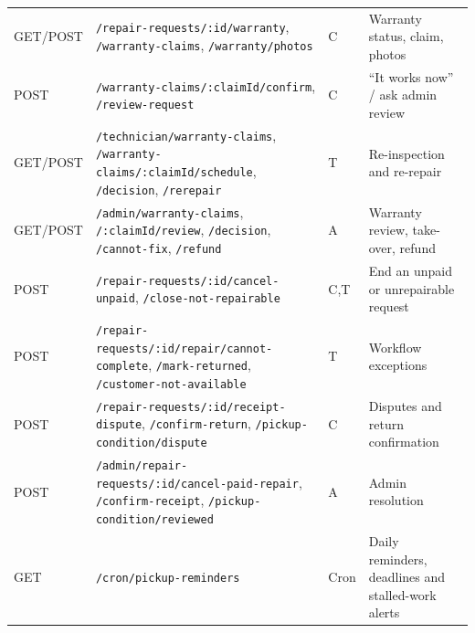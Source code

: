 \documentclass{standalone}
\begin{document}
{\begin{longtable}{@{}p{1.5cm}p{7.4cm}p{0.9cm}p{3.6cm}@{}}
GET/POST & \nolinkurl{/repair-requests/:id/warranty}, \nolinkurl{/warranty-claims}, \nolinkurl{/warranty/photos} & C & Warranty status, claim, photos \\
POST & \nolinkurl{/warranty-claims/:claimId/confirm}, \nolinkurl{/review-request} & C & ``It works now'' / ask admin review \\
GET/POST & \nolinkurl{/technician/warranty-claims}, \nolinkurl{/warranty-claims/:claimId/schedule}, \nolinkurl{/decision}, \nolinkurl{/rerepair} & T & Re-inspection and re-repair \\
GET/POST & \nolinkurl{/admin/warranty-claims}, \nolinkurl{/:claimId/review}, \nolinkurl{/decision}, \nolinkurl{/cannot-fix}, \nolinkurl{/refund} & A & Warranty review, take-over, refund \\
POST & \nolinkurl{/repair-requests/:id/cancel-unpaid}, \nolinkurl{/close-not-repairable} & C,T & End an unpaid or unrepairable request \\
POST & \nolinkurl{/repair-requests/:id/repair/cannot-complete}, \nolinkurl{/mark-returned}, \nolinkurl{/customer-not-available} & T & Workflow exceptions \\
POST & \nolinkurl{/repair-requests/:id/receipt-dispute}, \nolinkurl{/confirm-return}, \nolinkurl{/pickup-condition/dispute} & C & Disputes and return confirmation \\
POST & \nolinkurl{/admin/repair-requests/:id/cancel-paid-repair}, \nolinkurl{/confirm-receipt}, \nolinkurl{/pickup-condition/reviewed} & A & Admin resolution \\
GET & \nolinkurl{/cron/pickup-reminders} & Cron & Daily reminders, deadlines and stalled-work alerts \\
\end{longtable}
}
\end{document}
